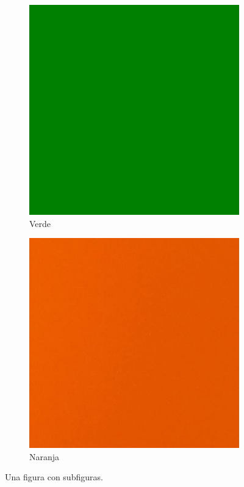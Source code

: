 \begin{figure}[H]
\begin{subfigure}{0.3\textwidth}
		\includegraphics[width=\textwidth]{./img/green.png}
		\caption{Verde}
	\end{subfigure}
	\begin{subfigure}{0.3\textwidth}
		\includegraphics[width=\textwidth]{./img/orange.jpg}
		\caption{Naranja}
	\end{subfigure}
	\caption{Una figura con subfiguras.}
	\label{fig:colores}
\end{figure}

